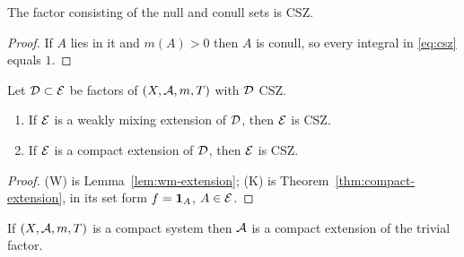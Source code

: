 \begin{lemma}
  \label{lem:trivial-csz}
  \leanok
  The factor consisting of the null and conull sets is CSZ.
\end{lemma}

\begin{proof}
  \leanok
  If $A$ lies in it and $m(A) > 0$ then $A$ is conull, so every integral in \eqref{eq:csz}
  equals $1$.
\end{proof}

\begin{lemma}
  \label{lem:extensions}
  Let $\mathcal{D} \subset \mathcal{E}$ be factors of $(X,\mathcal{A},m,T)$ with $\mathcal{D}$ CSZ.
  \begin{enumerate}
    \item[(W)] If $\mathcal{E}$ is a weakly mixing extension of $\mathcal{D}$, then $\mathcal{E}$ is CSZ.
    \item[(K)] If $\mathcal{E}$ is a compact extension of $\mathcal{D}$, then $\mathcal{E}$ is CSZ.
  \end{enumerate}
\end{lemma}

\begin{proof}
  (W) is Lemma~\ref{lem:wm-extension}; (K) is Theorem~\ref{thm:compact-extension}, in its set
  form $f = \mathbf{1}_A$, $A \in \mathcal{E}$.
\end{proof}

\begin{lemma}
  \label{lem:compact-system-extension}
  \leanok
  If $(X,\mathcal{A},m,T)$ is a compact system then $\mathcal{A}$ is a compact extension of the trivial
  factor.
\end{lemma}

